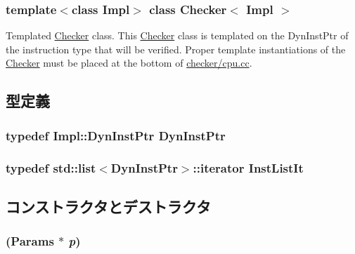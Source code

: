 \subsubsection*{template$<$class Impl$>$ class Checker$<$ Impl $>$}

Templated \hyperlink{classChecker}{Checker} class. This \hyperlink{classChecker}{Checker} class is templated on the DynInstPtr of the instruction type that will be verified. Proper template instantiations of the \hyperlink{classChecker}{Checker} must be placed at the bottom of \hyperlink{checker_2cpu_8cc}{checker/cpu.cc}. 

\subsection{型定義}
\hypertarget{classChecker_a028ce10889c5f6450239d9e9a7347976}{
\subsubsection[{DynInstPtr}]{\setlength{\rightskip}{0pt plus 5cm}typedef Impl::DynInstPtr {\bf DynInstPtr}}}
\label{classChecker_a028ce10889c5f6450239d9e9a7347976}
\hypertarget{classChecker_a4da46d72d68fcd5bfe65dc701c358379}{
\subsubsection[{InstListIt}]{\setlength{\rightskip}{0pt plus 5cm}typedef {\bf std::list}$<${\bf DynInstPtr}$>$::iterator {\bf InstListIt}}}
\label{classChecker_a4da46d72d68fcd5bfe65dc701c358379}


\subsection{コンストラクタとデストラクタ}
\hypertarget{classChecker_a5e269456f6adf2d73f7c41acd1b626e9}{
\subsubsection[{Checker}]{ ({\bf Params} $\ast$ {\em p})}}
\label{classChecker_a5e269456f6adf2d73f7c41acd1b626e9}




